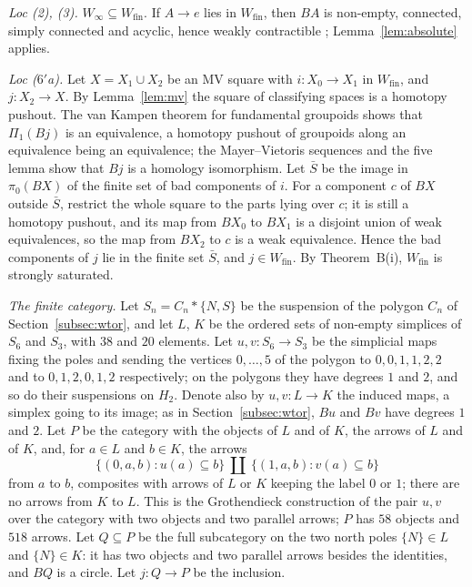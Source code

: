 \documentclass[11pt,a4paper]{article}
\theoremstyle{definition}
\newcommand{\Winf}{W_{\infty}}
\newcommand{\Wfin}{W_{\mathrm{fin}}}
\newcommand{\Pione}{\Pi_1}
\begin{document}
\emph{Loc (2), (3).} $\Winf\subseteq\Wfin$. If $A\to e$ lies in $\Wfin$, then $BA$ is
non-empty, connected, simply connected and acyclic, hence weakly contractible
\cite[Th.~4.32]{Hat02}; Lemma~\ref{lem:absolute} applies.

\emph{Loc ($6'$a).} Let $X=X_1\cup X_2$ be an MV square with $i\colon X_0\to X_1$ in $\Wfin$,
and $j\colon X_2\to X$. By Lemma~\ref{lem:mv} the square of classifying spaces is a homotopy
pushout. The van Kampen theorem for fundamental groupoids \cite[\S6.7]{Bro06} shows that
$\Pione(Bj)$ is an equivalence, a homotopy pushout of groupoids along an equivalence being an
equivalence; the Mayer--Vietoris sequences and the five lemma show that $Bj$ is a homology
isomorphism. Let $\bar S$ be the image in $\pi_0(BX)$ of the finite set of bad components of
$i$. For a component $c$ of $BX$ outside $\bar S$, restrict the whole square to the parts lying
over $c$; it is still a homotopy pushout, and its map from $BX_0$ to $BX_1$ is a disjoint union
of weak equivalences, so the map from $BX_2$ to $c$ is a weak equivalence. Hence the bad
components of $j$ lie in the finite set $\bar S$, and $j\in\Wfin$. By Theorem~B(i), $\Wfin$ is
strongly saturated.

\emph{The finite category.} Let $S_n=C_n*\{N,S\}$ be the suspension of the polygon $C_n$ of
Section~\ref{subsec:wtor}, and let $L$, $K$ be the ordered sets of non-empty simplices of
$S_6$ and $S_3$, with $38$ and $20$ elements. Let $u,v\colon S_6\to S_3$ be the simplicial maps
fixing the poles and sending the vertices $0,\dots,5$ of the polygon to $0,0,1,1,2,2$ and to
$0,1,2,0,1,2$ respectively; on the polygons they have degrees $1$ and $2$, and so do their
suspensions on $H_2$. Denote also by $u,v\colon L\to K$ the induced maps, a simplex going to
its image; as in Section~\ref{subsec:wtor}, $Bu$ and $Bv$ have degrees $1$ and $2$. Let $P$ be the category with the objects of $L$ and of $K$, the arrows of $L$ and of
$K$, and, for $a\in L$ and $b\in K$, the arrows
\[
\{(0,a,b): u(a)\subseteq b\}\ \amalg\ \{(1,a,b): v(a)\subseteq b\}
\]
from $a$ to $b$, composites with arrows of $L$ or $K$ keeping the label $0$ or $1$; there are
no arrows from $K$ to $L$. This is the Grothendieck construction of the pair $u,v$ over the
category with two objects and two parallel arrows; $P$ has $58$ objects and $518$ arrows. Let
$Q\subseteq P$ be the full subcategory on the two north poles $\{N\}\in L$ and $\{N\}\in K$: it has
two objects and two parallel arrows besides the identities, and $BQ$ is a circle. Let
$j\colon Q\to P$ be the inclusion.
\end{document}
